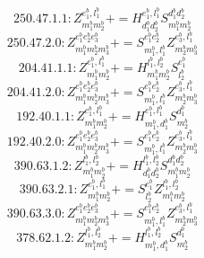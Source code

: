 \documentclass[letterpaper,10pt,fleqn,leqno,onecolumn]{article}
\begin{document}
\begin{equation} \;\;\;\;\;\;  250.47.1.1: Z^{e_{1}^{b},l_{1}^{b}}_{m_{1}^{b}m_{2}^{b}}+=H^{e_{1}^{b},l_{1}^{b}}_{d_{1}^{b}d_{2}^{b}}S^{d_{1}^{b}d_{2}^{b}}_{m_{1}^{b}m_{2}^{b}} \end{equation}
\begin{equation} \;\;\;\;\;\;  250.47.2.0: Z^{e_{1}^{b}e_{2}^{b}e_{3}^{b}}_{m_{1}^{b}m_{2}^{b}m_{3}^{b}}+=S^{e_{1}^{b}e_{2}^{b}}_{m_{1}^{b},l_{1}^{b}}Z^{e_{3}^{b},l_{1}^{b}}_{m_{2}^{b}m_{3}^{b}} \end{equation}
\begin{equation} \;\;\;\;\;\;  204.41.1.1: Z^{e_{1}^{b},l_{1}^{b}}_{m_{1}^{b}m_{2}^{b}}+=H^{l_{1}^{b},l_{2}^{b}}_{m_{1}^{b}m_{2}^{b}}S^{e_{1}^{b}}_{l_{2}^{b}} \end{equation}
\begin{equation} \;\;\;\;\;\;  204.41.2.0: Z^{e_{1}^{b}e_{2}^{b}e_{3}^{b}}_{m_{1}^{b}m_{2}^{b}m_{3}^{b}}+=S^{e_{1}^{b}e_{2}^{b}}_{m_{1}^{b},l_{1}^{b}}Z^{e_{3}^{b},l_{1}^{b}}_{m_{2}^{b}m_{3}^{b}} \end{equation}
\begin{equation} \;\;\;\;\;\;  192.40.1.1: Z^{e_{1}^{b},l_{1}^{b}}_{m_{1}^{b}m_{2}^{b}}+=H^{e_{1}^{b},l_{1}^{b}}_{m_{1}^{b},d_{1}^{b}}S^{d_{1}^{b}}_{m_{2}^{b}} \end{equation}
\begin{equation} \;\;\;\;\;\;  192.40.2.0: Z^{e_{1}^{b}e_{2}^{b}e_{3}^{b}}_{m_{1}^{b}m_{2}^{b}m_{3}^{b}}+=S^{e_{1}^{b}e_{2}^{b}}_{m_{1}^{b},l_{1}^{b}}Z^{e_{3}^{b},l_{1}^{b}}_{m_{2}^{b}m_{3}^{b}} \end{equation}
\begin{equation} \;\;\;\;\;\;  390.63.1.2: Z^{l_{1}^{b},l_{2}^{b}}_{m_{1}^{b}m_{2}^{b}}+=H^{l_{1}^{b},l_{2}^{b}}_{d_{1}^{b}d_{2}^{b}}S^{d_{1}^{b}d_{2}^{b}}_{m_{1}^{b}m_{2}^{b}} \end{equation}
\begin{equation} \;\;\;\;\;\;  390.63.2.1: Z^{e_{1}^{b},l_{1}^{b}}_{m_{1}^{b}m_{2}^{b}}+=S^{e_{1}^{b}}_{l_{2}^{b}}Z^{l_{1}^{b},l_{2}^{b}}_{m_{1}^{b}m_{2}^{b}} \end{equation}
\begin{equation} \;\;\;\;\;\;  390.63.3.0: Z^{e_{1}^{b}e_{2}^{b}e_{3}^{b}}_{m_{1}^{b}m_{2}^{b}m_{3}^{b}}+=S^{e_{1}^{b}e_{2}^{b}}_{m_{1}^{b},l_{1}^{b}}Z^{e_{3}^{b},l_{1}^{b}}_{m_{2}^{b}m_{3}^{b}} \end{equation}
\begin{equation} \;\;\;\;\;\;  378.62.1.2: Z^{l_{1}^{b},l_{2}^{b}}_{m_{1}^{b}m_{2}^{b}}+=H^{l_{1}^{b},l_{2}^{b}}_{m_{1}^{b},d_{1}^{b}}S^{d_{1}^{b}}_{m_{2}^{b}} \end{equation}
\end{document}
